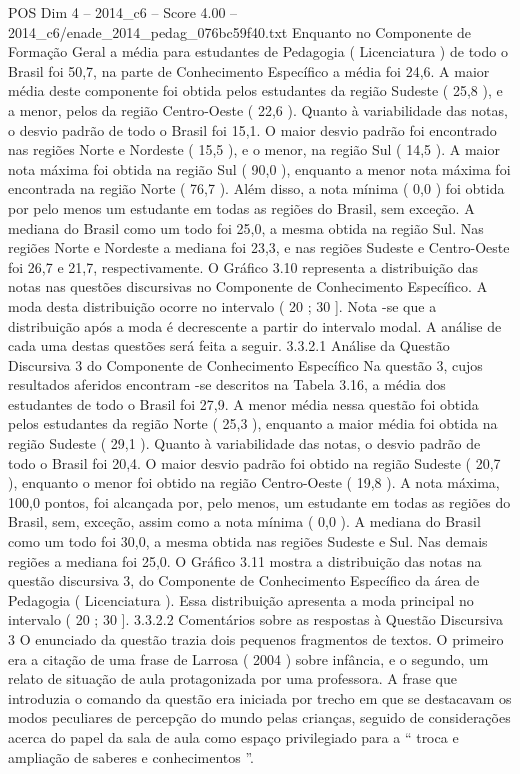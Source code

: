 \begin{textsample}{POS Dim 4 – 2014\_c6 – Score 4.00 – 2014\_c6/enade\_2014\_pedag\_076bc59f40.txt}
Enquanto no Componente de Formação Geral a média para estudantes de Pedagogia ( Licenciatura ) de todo o Brasil foi 50,7, na parte de Conhecimento Específico a média foi 24,6.
A maior média deste componente foi obtida pelos estudantes da região Sudeste ( 25,8 ), e a menor, pelos da região Centro-Oeste ( 22,6 ).
Quanto à variabilidade das notas, o desvio padrão de todo o Brasil foi 15,1.
O maior desvio padrão foi encontrado nas regiões Norte e Nordeste ( 15,5 ), e o menor, na região Sul ( 14,5 ).
A maior nota máxima foi obtida na região Sul ( 90,0 ), enquanto a menor nota máxima foi encontrada na região Norte ( 76,7 ).
Além disso, a nota mínima ( 0,0 ) foi obtida por pelo menos um estudante em todas as regiões do Brasil, sem exceção.
A mediana do Brasil como um todo foi 25,0, a mesma obtida na região Sul.
Nas regiões Norte e Nordeste a mediana foi 23,3, e nas regiões Sudeste e Centro-Oeste foi 26,7 e 21,7, respectivamente.
O Gráfico 3.10 representa a distribuição das notas nas questões discursivas no Componente de Conhecimento Específico.
A moda desta distribuição ocorre no intervalo ( 20 ; 30 ].
Nota -se que a distribuição após a moda é decrescente a partir do intervalo modal.
A análise de cada uma destas questões será feita a seguir. 3.3.2.1 Análise da Questão Discursiva 3 do Componente de Conhecimento Específico Na questão 3, cujos resultados aferidos encontram -se descritos na Tabela 3.16, a média dos estudantes de todo o Brasil foi 27,9.
A menor média nessa questão foi obtida pelos estudantes da região Norte ( 25,3 ), enquanto a maior média foi obtida na região Sudeste ( 29,1 ).
Quanto à variabilidade das notas, o desvio padrão de todo o Brasil foi 20,4.
O maior desvio padrão foi obtido na região Sudeste ( 20,7 ), enquanto o menor foi obtido na região Centro-Oeste ( 19,8 ).
A nota máxima, 100,0 pontos, foi alcançada por, pelo menos, um estudante em todas as regiões do Brasil, sem, exceção, assim como a nota mínima ( 0,0 ).
A mediana do Brasil como um todo foi 30,0, a mesma obtida nas regiões Sudeste e Sul.
Nas demais regiões a mediana foi 25,0.
O Gráfico 3.11 mostra a distribuição das notas na questão discursiva 3, do Componente de Conhecimento Específico da área de Pedagogia ( Licenciatura ).
Essa distribuição apresenta a moda principal no intervalo ( 20 ; 30 ]. 3.3.2.2 Comentários sobre as respostas à Questão Discursiva 3 O enunciado da questão trazia dois pequenos fragmentos de textos.
O primeiro era a citação de uma frase de Larrosa ( 2004 ) sobre infância, e o segundo, um relato de situação de aula protagonizada por uma professora.
A frase que introduzia o comando da questão era iniciada por trecho em que se destacavam os modos peculiares de percepção do mundo pelas crianças, seguido de considerações acerca do papel da sala de aula como espaço privilegiado para a “ troca e ampliação de saberes e conhecimentos ”.

\end{textsample}
